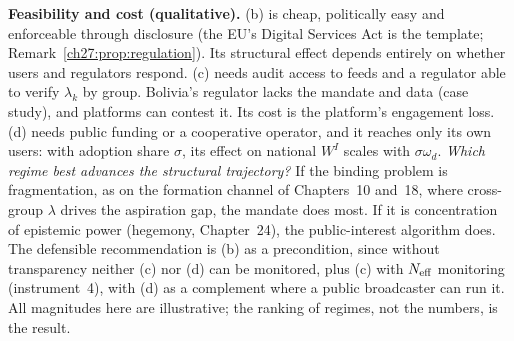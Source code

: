 \documentclass[../solutions_manual.tex]{subfiles}
\begin{document}
 \textbf{Feasibility and cost (qualitative).} (b) is cheap, politically easy and enforceable through disclosure (the EU's Digital Services Act is the template; Remark~\ref{ch27:prop:regulation}). Its structural effect depends entirely on whether users and regulators respond. (c) needs audit access to feeds and a regulator able to verify $\lambda_k$ by group. Bolivia's regulator lacks the mandate and data (case study), and platforms can contest it. Its cost is the platform's engagement loss. (d) needs public funding or a cooperative operator, and it reaches only its own users: with adoption share $\sigma$, its effect on national $W^I$ scales with $\sigma\omega_d$. \emph{Which regime best advances the structural trajectory?} If the binding problem is fragmentation, as on the formation channel of Chapters~10 and~18, where cross-group $\lambda$ drives the aspiration gap, the mandate does most. If it is concentration of epistemic power (hegemony, Chapter~24), the public-interest algorithm does. The defensible recommendation is (b) as a precondition, since without transparency neither (c) nor (d) can be monitored, plus (c) with $N_{\text{eff}}$ monitoring (instrument~4), with (d) as a complement where a public broadcaster can run it. All magnitudes here are illustrative; the ranking of regimes, not the numbers, is the result.

\endgroup
\end{document}

